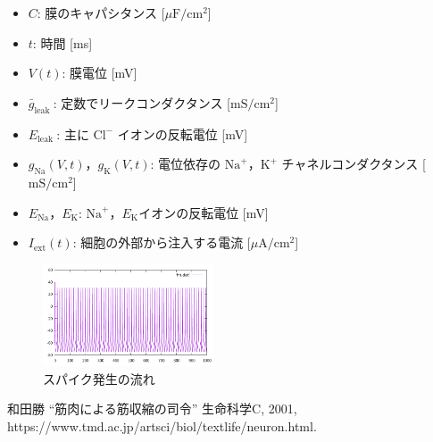 \documentclass[dvipdfmx, A4j, twocolumn, 10.5pt]{jsarticle}
\begin{document}
\begin{itemize}
    \item $C$: 膜のキャパシタンス [$\mu \mathrm{F} / \mathrm{cm}^2$]
    \item $t$: 時間 [ms]
    \item $V(t)$: 膜電位 [mV]
    \item $\bar{g}_{\text {leak }}$: 定数でリークコンダクタンス [$\mathrm{mS} / \mathrm{cm}^2$]
    \item $E_{\text {leak }}$: 主に $\mathrm{Cl}^{-}$ イオンの反転電位 [mV]
    \item $g_{\mathrm{Na}}(V, t)$，$g_{\mathrm{K}}(V, t)$: 電位依存の $\mathrm{Na}^{+}$，$\mathrm{K}^{+}$ チャネルコンダクタンス [$\mathrm{mS} / \mathrm{cm}^2$]
    \item $E_{\mathrm{Na}}$，$E_{\mathrm{K}}$: $\mathrm{Na}^{+}$，$E_{\mathrm{K}}$イオンの反転電位 [mV]
    \item $I_{\mathrm{ext}}(t)$: 細胞の外部から注入する電流 [$\mu \mathrm{A} / \mathrm{cm}^2$]
\end{itemize}

\begin{figure}[h]
 \centering
 \includegraphics[width=0.45\textwidth]{./images/0301_hh_1000.pdf}
 \caption{スパイク発生の流れ} 
\end{figure}

\begin{thebibliography}{99}
 和田勝 ``筋肉による筋収縮の司令'' 生命科学C, 2001, https://www.tmd.ac.jp/artsci/biol/textlife/neuron.html.
\end{thebibliography}
\end{document}
